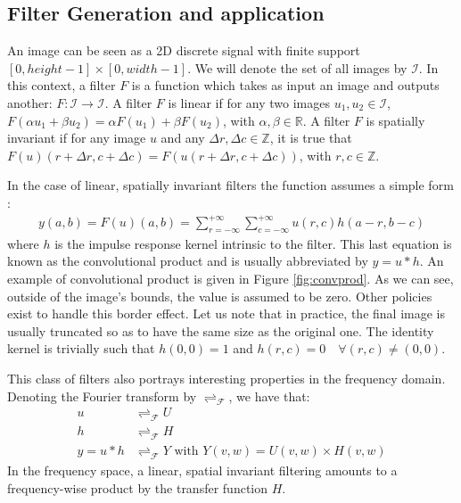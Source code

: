 \documentclass[a4paper]{report}
\begin{document}
		\subsection{Filter Generation and application}\label{subsec:methodo-filtergen}
		An image can be seen as a 2D discrete signal with finite support $[0, height-1] \times [0, width-1]$. We will denote the set of all images by $\mathcal{I}$.
		In this context, a filter $F$ is a function which takes as input an image and outputs another: $F : \mathcal{I} \rightarrow \mathcal{I}$. A filter $F$ is linear if for any two images $u_1, u_2 \in \mathcal{I}$, $F(\alpha u_1 + \beta u_2) = \alpha F(u_1) + \beta F(u_2)$, with $\alpha, \beta \in \mathbb{R}$. A filter $F$ is spatially invariant if for any image $u$ and any $\Delta r, \Delta c \in \mathbb{Z}$, it is true that $F(u)(r +\Delta r, c + \Delta c) = F(u(r + \Delta r, c + \Delta c))$, with $r, c \in \mathbb{Z}$.
		\par
		In the case of linear, spatially invariant filters the function assumes a simple form : 
		\begin{align*}
			y(a, b) = F(u)(a,b) = \sum_{r = - \infty}^{+ \infty} \sum_{c = - \infty}^{+ \infty} u(r, c) h(a-r, b-c)
		\end{align*}
		where $h$ is the impulse response kernel intrinsic to the filter. This last equation is known as the convolutional product and is usually abbreviated by $y = u * h$. An example of convolutional product is given in Figure \ref{fig:convprod}. As we can see, outside of the image's bounds, the value is assumed to be zero. Other policies exist to handle this border effect. Let us note that in practice, the final image is usually truncated so as to have the same size as the original one. The identity kernel is trivially such that $h(0,0) = 1$ and $h(r,c) = 0 \quad \forall (r,c) \neq (0,0)$. 
		\par
		This class of filters also portrays interesting properties in the frequency domain. Denoting the Fourier transform by $\rightleftharpoons_\mathcal{F}$, we have that:
		\begin{align*}
			u &\rightleftharpoons_\mathcal{F} U \\
			h &\rightleftharpoons_\mathcal{F} H \\ 
			y = u * h &\rightleftharpoons_\mathcal{F} Y \text{ with } Y(v, w) = U(v, w) \times H(v, w)
		\end{align*}
		In the frequency space, a linear, spatial invariant filtering amounts to a frequency-wise product by the transfer function $H$.
		
\end{document}
